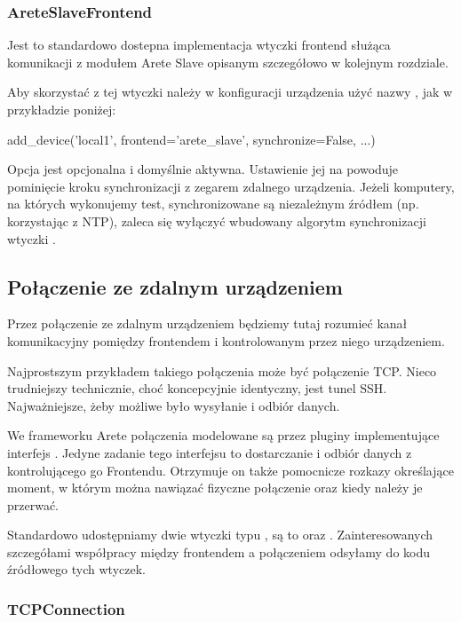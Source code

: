 \documentclass[00-praca-magisterska.tex]{subfiles}
\begin{document}
\subsubsection{AreteSlaveFrontend}

Jest to standardowo dostepna implementacja wtyczki frontend służąca komunikacji
z modułem Arete Slave opisanym szczegółowo w kolejnym rozdziale.

Aby skorzystać z tej wtyczki należy w konfiguracji urządzenia użyć nazwy
, jak w przykładzie poniżej:

\begin{pythoncode}
  add_device('local1',
    frontend='arete_slave',
    synchronize=False,
    ...)
\end{pythoncode}

Opcja  jest opcjonalna i domyślnie aktywna. Ustawienie jej na
 powoduje pominięcie kroku synchronizacji z zegarem zdalnego
urządzenia. Jeżeli komputery, na których wykonujemy test, synchronizowane są
niezależnym źródłem (np. korzystając z NTP), zaleca się wyłączyć wbudowany
algorytm synchronizacji wtyczki .

\subsection{Połączenie ze zdalnym urządzeniem}

Przez połączenie ze zdalnym urządzeniem będziemy tutaj rozumieć kanał
komunikacyjny pomiędzy frontendem i kontrolowanym przez niego urządzeniem.

Najprostszym przykładem takiego połączenia może być połączenie TCP. Nieco
trudniejszy technicznie, choć koncepcyjnie identyczny, jest tunel SSH.
Najważniejsze, żeby możliwe było wysyłanie i odbiór danych.

We frameworku Arete połączenia modelowane są przez pluginy implementujące
interfejs . Jedyne zadanie tego interfejsu to
dostarczanie i odbiór danych z kontrolującego go Frontendu. Otrzymuje on także
pomocnicze rozkazy określające moment, w którym można nawiązać fizyczne
połączenie oraz kiedy należy je przerwać.

Standardowo udostępniamy dwie wtyczki typu , są to
 oraz . Zainteresowanych szczegółami
współpracy między frontendem a połączeniem odsyłamy do kodu źródłowego tych
wtyczek.

\subsubsection{TCPConnection}
\end{document}
